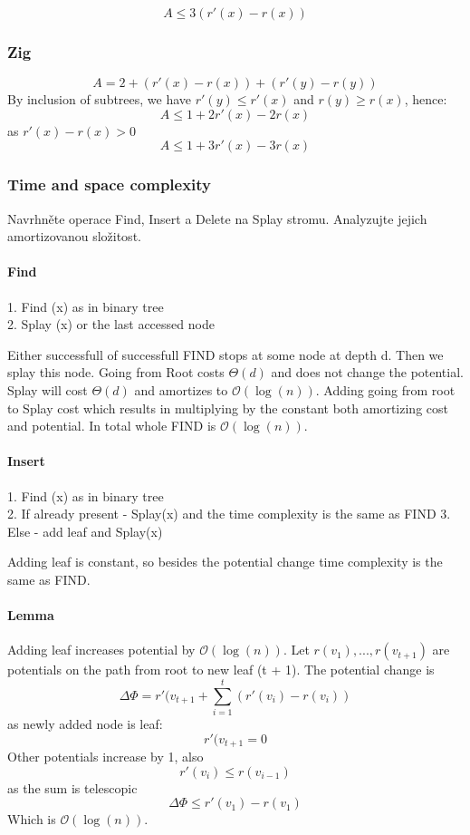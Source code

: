 \documentclass[12pt]{article}
\newcommand{\bigO}{\mathcal{O}}
\newcommand{\bigOlog}{\bigO(\log(n))}
\begin{document}
\[ A \leq 3(r'(x) - r(x)) \]

\subsubsection*{Zig}

\[ A = 2 + (r'(x) - r(x)) + (r'(y) - r(y)) \]
By inclusion of subtrees, we have $ r'(y) \leq r'(x) $ and $ r(y) \geq r(x) $, hence:
\[ A \leq 1 + 2r'(x) - 2r(x) \]
as $ r'(x) - r(x) > 0 $
\[ A \leq 1 + 3r'(x) - 3r(x) \]

\subsubsection{Time and space complexity}

Navrhněte operace Find, Insert a Delete na Splay stromu. Analyzujte jejich amortizovanou složitost.

\paragraph{Find}
1. Find (x) as in binary tree \\
2. Splay (x) or the last accessed node

Either successfull of successfull FIND stops at some node at depth d. Then we splay this node.
Going from Root costs $ \Theta(d) $ and does not change the potential. Splay will cost $ \Theta(d) $ and amortizes to $\bigO(\log(n))$. Adding going from root to Splay cost which results in multiplying by the constant both amortizing cost and potential. In total whole FIND is $\bigO(\log(n))$.

\paragraph{Insert}

1. Find (x) as in binary tree \\
2. If already present - Splay(x) and the time complexity is the same as FIND
3. Else - add leaf and Splay(x)

Adding leaf is constant, so besides the potential change time complexity is the same as FIND.

\paragraph{Lemma} Adding leaf increases potential by $\bigO(\log(n))$.
Let $ r(v_1), ... , r(v_{t+1}) $ are potentials on the path from root to new leaf (t + 1). The potential change is
\[ \Delta \Phi = r'(v_{t+1} + \sum_{i = 1}^t (r'(v_i) - r(v_i)) \]
as newly added node is leaf:
\[ r'(v_{t+1} = 0 \]
Other potentials increase by 1, also
\[ r'(v_i) \leq r(v_{i - 1}) \]
as the sum is telescopic
\[ \Delta \Phi \leq r'(v_1) - r(v_1) \]
Which is $\bigOlog$.
\end{document}
